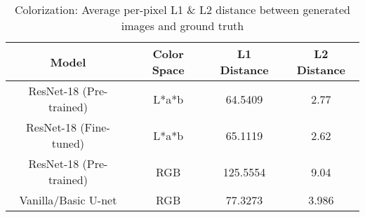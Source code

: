 \begin{table}[!htb]
\centering
\setlength{\tabcolsep}{4pt} %
\renewcommand{\arraystretch}{1.5} %
\footnotesize
\begin{tabular}{c | c | c | c}
        \hline
        \textbf{Model} & \textbf{Color Space} & \textbf{
        L1 Distance} & \textbf{L2 Distance}\\
        \hline
        ResNet-18 (Pre-trained) & L*a*b & 64.5409 & 2.77\\
        ResNet-18 (Fine-tuned) & L*a*b & 65.1119 & 2.62\\
        ResNet-18 (Pre-trained) & RGB & 125.5554 & 9.04\\
        Vanilla/Basic U-net & RGB & 77.3273 & 3.986\\
        \hline
    \end{tabular}
\caption{Colorization: Average per-pixel L1 \& L2 distance between generated images and ground truth}
\label{tab:colorization_results}
\end{table}